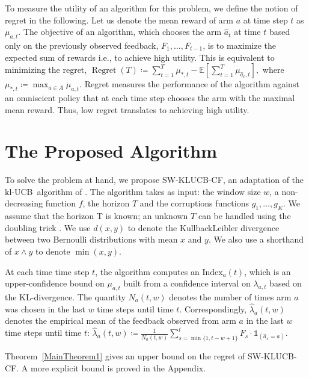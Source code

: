 \documentclass[letterpaper]{article} %
\newcommand{\ind}{\mathds{1}}
\newcommand{\bE}{\mathds{E}}
\newcommand{\Regret}{\operatorname{Regret}}
\newcommand{\ArmAt}{\hat{a}}
\newcommand{\defined}{\coloneqq}
\newcommand{\SWKLUCBCF}{\textsc{SW-KLUCB-CF}}
\newcommand{\KLUCB}{$\mathrm{kl}$-\textsc{UCB}}
\newcommand{\optMean}[1]{\mu_{*, #1}}
\newcommand{\meanReward}[2]{\mu_{#1, #2}}
\newcommand{\meanFeedback}[2]{\lambda_{#1, #2}}
\newcommand{\windowsize}{w}
\begin{document}
To measure the utility of an algorithm for this problem, we define the notion of regret in the following. Let us denote the mean reward of arm $a$ at time step $t$ as $\meanReward{a}{t}$. The objective of an algorithm, which chooses the arm $\ArmAt_{t}$ at time $t$ based only on the previously observed feedback, $F_1,\dots,F_{t-1}$, is to maximize the expected sum of rewards i.e., to achieve high utility. This is equivalent to minimizing the regret,
$
\Regret(T) \defined \sum_{t=1}^{T} \optMean{t} - \bE\left[\sum_{t=1}^{T}\meanReward{\hat{a}_t}{t}\right],$
where $\optMean{t} \defined \max_{a \in A} \meanReward{a}{t}$.
Regret measures the performance of the algorithm against an omniscient policy that at each time step chooses the arm with the maximal mean reward. Thus, low regret translates to achieving high utility.


\section{The Proposed Algorithm}
To solve the problem at hand, we propose \SWKLUCBCF,
an adaptation of the \KLUCB \ algorithm of \citet{KLUCBJournal}.
The algorithm takes as input: the window size $\windowsize$, a non-decreasing function $f$, the horizon $T$ and the corruptions functions $g_1, \dots, g_K$. We assume that the horizon T is known; an unknown $T$ can be handled using the doubling trick \citep{besson:hal-01736357}. We use $d(x,y)$ to denote the KullbackLeibler divergence between two Bernoulli distributions with mean $x$ and $y$.
We also use a shorthand of $x \wedge y$ to denote $\min(x,y)$.


At each time time step $t$, the algorithm computes an $\mathrm{Index}_a(t)$, which is an upper-confidence bound on $\meanReward{a}{t}$ built from a confidence interval on $\meanFeedback{a}{t}$ based on the KL-divergence.
The quantity $N_a(t, \windowsize)$ denotes the number of times arm $a$ was chosen in the last $\windowsize$ time steps until time $t$.
Correspondingly, $\hat{\lambda}_a(t, \windowsize)$ denotes the empirical mean of the feedback observed from arm $a$ in the last $\windowsize$ time steps until time $t$: $\hat{\lambda}_a(t, w) \defined \frac{1}{N_a(t, \windowsize)}\sum_{s=\min\{1, t-\windowsize+1\}}^t F_s \cdot \ind_{(\ArmAt_s = a)}$.



Theorem~\ref{MainTheorem1}  gives an upper bound on the regret of \SWKLUCBCF. A more explicit bound is proved in the Appendix.
\end{document}
